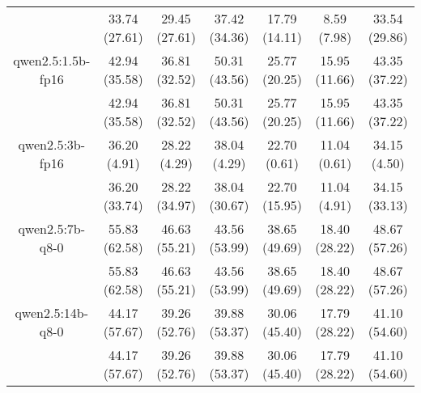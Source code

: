 \begin{table}[]
{\begin{tabular}{ccccccc}
        

        \multicolumn{1}{c|}{} & 33.74 (27.61) & 29.45 (27.61) & \multicolumn{1}{c|}{37.42 (34.36)} & 17.79 (14.11) & \multicolumn{1}{c|}{8.59 (7.98)} & 33.54 (29.86) \\
        \cline{1-7}
        

        \multicolumn{1}{c|}{qwen2.5:1.5b-fp16} & 42.94 (35.58) & 36.81 (32.52) & \multicolumn{1}{c|}{50.31 (43.56)} & 25.77 (20.25) & \multicolumn{1}{c|}{15.95 (11.66)} & 43.35 (37.22) \\
        
        

        \multicolumn{1}{c|}{} & 42.94 (35.58) & 36.81 (32.52) & \multicolumn{1}{c|}{50.31 (43.56)} & 25.77 (20.25) & \multicolumn{1}{c|}{15.95 (11.66)} & 43.35 (37.22) \\
        \cline{1-7}
        

        \multicolumn{1}{c|}{qwen2.5:3b-fp16} & 36.20 (4.91) & 28.22 (4.29) & \multicolumn{1}{c|}{38.04 (4.29)} & 22.70 (0.61) & \multicolumn{1}{c|}{11.04 (0.61)} & 34.15 (4.50) \\
        
        

        \multicolumn{1}{c|}{} & 36.20 (33.74) & 28.22 (34.97) & \multicolumn{1}{c|}{38.04 (30.67)} & 22.70 (15.95) & \multicolumn{1}{c|}{11.04 (4.91)} & 34.15 (33.13) \\
        \cline{1-7}
        

        \multicolumn{1}{c|}{qwen2.5:7b-q8-0} & 55.83 (62.58) & 46.63 (55.21) & \multicolumn{1}{c|}{43.56 (53.99)} & 38.65 (49.69) & \multicolumn{1}{c|}{18.40 (28.22)} & 48.67 (57.26) \\
        
        

        \multicolumn{1}{c|}{} & 55.83 (62.58) & 46.63 (55.21) & \multicolumn{1}{c|}{43.56 (53.99)} & 38.65 (49.69) & \multicolumn{1}{c|}{18.40 (28.22)} & 48.67 (57.26) \\
        \cline{1-7}
        

        \multicolumn{1}{c|}{qwen2.5:14b-q8-0} & 44.17 (57.67) & 39.26 (52.76) & \multicolumn{1}{c|}{39.88 (53.37)} & 30.06 (45.40) & \multicolumn{1}{c|}{17.79 (28.22)} & 41.10 (54.60) \\
        
        

        \multicolumn{1}{c|}{} & 44.17 (57.67) & 39.26 (52.76) & \multicolumn{1}{c|}{39.88 (53.37)} & 30.06 (45.40) & \multicolumn{1}{c|}{17.79 (28.22)} & 41.10 (54.60) \\
        \cline{1-7}
        


\end{tabular}}
\end{table}
